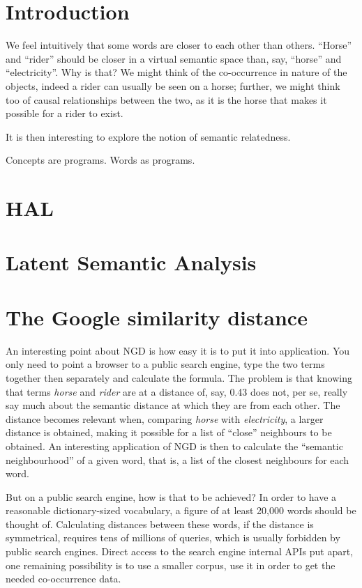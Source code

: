 \documentclass[a4paper,10pt]{article}
\begin{document}
\section{Introduction}

We feel intuitively that some words are closer to each other than others. ``Horse'' and ``rider'' should be closer in a
virtual semantic space than, say, ``horse'' and ``electricity''. Why is that? We might think of the co-occurrence in
nature of the objects, indeed a rider can usually be seen on a horse; further, we might think too of causal
relationships between the two, as it is the horse that makes it possible for a rider to exist. 

It is then interesting to explore the notion of semantic relatedness.

Concepts are programs. Words as programs.

\section{HAL}

\section{Latent Semantic Analysis}

\section{The Google similarity distance}

An interesting point about NGD is how easy it is to put it into application. You only need to point a browser to a
public search engine, type the two terms together then separately and calculate the formula. The problem is that
knowing that terms \textit{horse} and \textit{rider} are at a distance of, say, 0.43 does not, per se, really say much
about the semantic distance at which they are from each other. The distance becomes relevant when, comparing
\textit{horse} with \textit{electricity}, a larger distance is obtained, making it possible for a list of ``close''
neighbours to be obtained. An interesting application of NGD is then to calculate the ``semantic neighbourhood'' of a
given word, that is, a list of the closest neighbours for each word. 

But on a public search engine, how is that to be achieved? In order to have a reasonable dictionary-sized vocabulary, a
figure of at least 20,000 words should be thought of. Calculating distances between these words, if the distance is
symmetrical, requires tens of millions of queries, which is usually forbidden by public search engines. Direct access
to the search engine internal APIs put apart, one remaining possibility is to use a smaller corpus, use it in order to
get the needed co-occurrence data.
\end{document}
